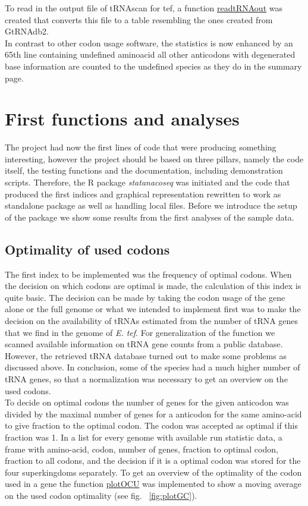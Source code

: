 To read in the output file of tRNAscan for tef, a function \hyperlink{function:rtRNAo}{readtRNAout} was created that converts this file to a table resembling the ones created from GtRNAdb2. \\

In contrast to other codon usage software, the statistics is now enhanced by an 65th line containing undefined aminoacid all other anticodons with degenerated base information are counted to the undefined species as they do in the summary page. \\ 

\section{First functions and analyses}
The project had now the first lines of code that were producing something interesting, however the project should be based on three pillars, namely the code itself, the testing functions and the documentation, including demonstration scripts. Therefore, the R package \textit{statanacoseq} was initiated and the code that produced the first indices and graphical representation rewritten to work as standalone package as well as handling local files. Before we introduce the setup of the package we show some results from the first analyses of the sample data.

\subsection{Optimality of used codons}
The first index to be implemented was the frequency of optimal codons. When the decision on which codons are optimal is made, the calculation of this index is quite basic. The decision can be made by taking the codon usage of the gene alone or the full genome or what we intended to implement first was to make the decision on the availability of tRNAs estimated from the number of tRNA genes that we find in the genome of \textit{E. tef}. For generalization of the function we scanned available information on tRNA gene counts from a public database. However, the retrieved tRNA database turned out to make some problems as discussed above. In conclusion, some of the species had a much higher number of tRNA genes, so that a normalization was necessary to get an overview on the used codons. \\

To decide on optimal codons the number of genes for the given anticodon was divided by the maximal number of genes for a anticodon for the same amino-acid to give fraction to the optimal codon. The codon was accepted as optimal if this fraction was 1. In a list for every genome with available run statistic data, a frame with amino-acid, codon, number of genes, fraction to optimal codon, fraction to all codons, and the decision if it is a optimal codon was stored for the four superkingdoms separately. To get an overview of the optimality of the codon used in a gene the function \hyperlink{function:plotOCU}{plotOCU} was implemented to show a moving average on the used codon optimality (see fig. ~\ref{fig:plotGC}). \\

